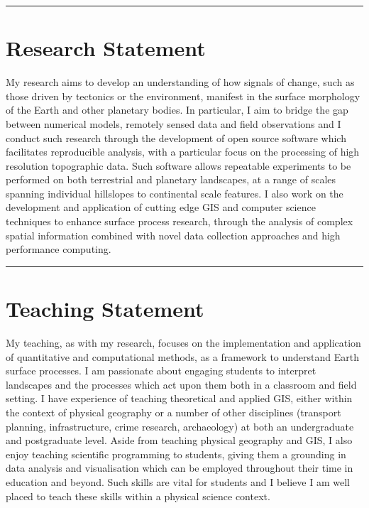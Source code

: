 \documentclass[10pt, a4paper]{article}
\begin{document}
\iflong

  \hrule
  \section*{Research Statement}
  \noindent

  My research aims to develop an understanding of how signals of change, such as those driven by tectonics or the environment, manifest in the surface morphology of the Earth and other planetary bodies. In particular, I aim to bridge the gap between numerical models, remotely sensed data and field observations and I conduct such research through the development of open source software which facilitates reproducible analysis, with a particular focus on the processing of high resolution topographic data. Such software allows repeatable experiments to be performed on both terrestrial and planetary landscapes, at a range of scales spanning individual hillslopes to continental scale features. I also work on the development and application of cutting edge GIS and computer science techniques to enhance surface process research, through the analysis of complex spatial information combined with novel data collection approaches and high performance computing.\\[0.05cm]

  \hrule
  \section*{Teaching Statement}
  \noindent

  My teaching, as with my research, focuses on the implementation and application of quantitative and computational methods, as a framework to understand Earth surface processes. I am passionate about engaging students to interpret landscapes and the processes which act upon them both in a classroom and field setting. I have experience of teaching theoretical and applied GIS, either within the context of physical geography or a number of other disciplines (transport planning, infrastructure, crime research, archaeology) at both an undergraduate and postgraduate level. Aside from teaching physical geography and GIS, I also enjoy teaching scientific programming to students, giving them a grounding in data analysis and visualisation which can be employed throughout their time in education and beyond. Such skills are vital for students and I believe I am well placed to teach these skills within a physical science context.\\[0.05cm]
\end{document}
